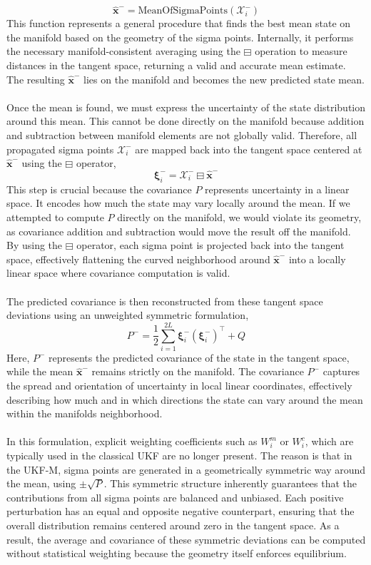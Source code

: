$$
    \hat{\mathbf{x}}^- = \text{MeanOfSigmaPoints}(\mathcal{X}_i^-)
$$
This function represents a general procedure that finds the best mean state on the manifold based on the geometry of the sigma points. Internally, it performs the necessary manifold-consistent averaging using the $\boxminus$ operation to measure distances in the tangent space, returning a valid and accurate mean estimate. The resulting $\hat{\mathbf{x}}^-$ lies on the manifold and becomes the new predicted state mean.
\\ \\
Once the mean is found, we must express the uncertainty of the state distribution around this mean. This cannot be done directly on the manifold because addition and subtraction between manifold elements are not globally valid. Therefore, all propagated sigma points $\mathcal{X}_i^-$ are mapped back into the tangent space centered at $\hat{\mathbf{x}}^-$ using the $\boxminus$ operator,  
$$
    \boldsymbol{\xi}_i^- = \mathcal{X}_i^- \boxminus \hat{\mathbf{x}}^-
$$
This step is crucial because the covariance $P$ represents uncertainty in a linear space. It encodes how much the state may vary locally around the mean. If we attempted to compute $P$ directly on the manifold, we would violate its geometry, as covariance addition and subtraction would move the result off the manifold. By using the $\boxminus$ operator, each sigma point is projected back into the tangent space, effectively flattening the curved neighborhood around $\hat{\mathbf{x}}^-$ into a locally linear space where covariance computation is valid.  
\\ \\
The predicted covariance is then reconstructed from these tangent space deviations using an unweighted symmetric formulation,
$$
    P^- = \frac{1}{2}\sum_{i=1}^{2L} \boldsymbol{\xi}_i^- (\boldsymbol{\xi}_i^-)^\top + Q
$$
Here, $P^-$ represents the predicted covariance of the state in the tangent space, while the mean $\hat{\mathbf{x}}^-$ remains strictly on the manifold. The covariance $P^-$ captures the spread and orientation of uncertainty in local linear coordinates, effectively describing how much and in which directions the state can vary around the mean within the manifolds neighborhood.  
\\ \\
In this formulation, explicit weighting coefficients such as $W_i^m$ or $W_i^c$, which are typically used in the classical UKF are no longer present. The reason is that in the UKF-M, sigma points are generated in a geometrically symmetric way around the mean, using $\pm\sqrt{P}$. This symmetric structure inherently guarantees that the contributions from all sigma points are balanced and unbiased. Each positive perturbation has an equal and opposite negative counterpart, ensuring that the overall distribution remains centered around zero in the tangent space. As a result, the average and covariance of these symmetric deviations can be computed without statistical weighting because the geometry itself enforces equilibrium.  

